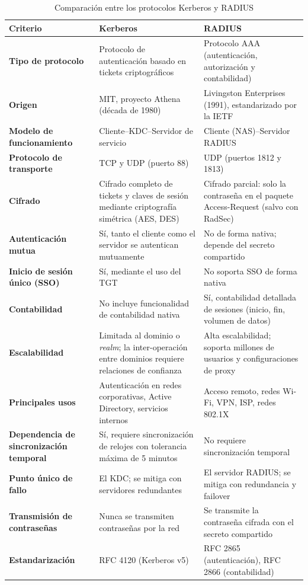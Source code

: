 \documentclass[letterpaper,12pt]{article}
\begin{document}
\begin{table}[h!]
\centering
\caption{Comparaci\'on entre los protocolos Kerberos y RADIUS}
\label{tab:comparacion}
\renewcommand{\arraystretch}{1.4}
\begin{tabularx}{\textwidth}{|>{\bfseries}p{3.8cm}|X|X|}
\hline
\textbf{Criterio} & \textbf{Kerberos} & \textbf{RADIUS} \\
\hline
Tipo de protocolo & Protocolo de autenticaci\'on basado en tickets criptogr\'aficos & Protocolo AAA (autenticaci\'on, autorizaci\'on y contabilidad) \\
\hline
Origen & MIT, proyecto Athena (d\'ecada de 1980) & Livingston Enterprises (1991), estandarizado por la IETF \\
\hline
Modelo de funcionamiento & Cliente--KDC--Servidor de servicio & Cliente (NAS)--Servidor RADIUS \\
\hline
Protocolo de transporte & TCP y UDP (puerto 88) & UDP (puertos 1812 y 1813) \\
\hline
Cifrado & Cifrado completo de tickets y claves de sesi\'on mediante criptograf\'ia sim\'etrica (AES, DES) & Cifrado parcial: solo la contrase\~na en el paquete Access-Request (salvo con RadSec) \\
\hline
Autenticaci\'on mutua & S\'i, tanto el cliente como el servidor se autentican mutuamente & No de forma nativa; depende del secreto compartido \\
\hline
Inicio de sesi\'on \'unico (SSO) & S\'i, mediante el uso del TGT & No soporta SSO de forma nativa \\
\hline
Contabilidad & No incluye funcionalidad de contabilidad nativa & S\'i, contabilidad detallada de sesiones (inicio, fin, volumen de datos) \\
\hline
Escalabilidad & Limitada al dominio o \textit{realm}; la inter-operaci\'on entre dominios requiere relaciones de confianza & Alta escalabilidad; soporta millones de usuarios y configuraciones de proxy \\
\hline
Principales usos & Autenticaci\'on en redes corporativas, Active Directory, servicios internos & Acceso remoto, redes Wi-Fi, VPN, ISP, redes 802.1X \\
\hline
Dependencia de sincronizaci\'on temporal & S\'i, requiere sincronizaci\'on de relojes con tolerancia m\'axima de 5 minutos & No requiere sincronizaci\'on temporal \\
\hline
Punto \'unico de fallo & El KDC; se mitiga con servidores redundantes & El servidor RADIUS; se mitiga con redundancia y failover \\
\hline
Transmisi\'on de contrase\~nas & Nunca se transmiten contrase\~nas por la red & Se transmite la contrase\~na cifrada con el secreto compartido \\
\hline
Estandarizaci\'on & RFC 4120 (Kerberos v5) & RFC 2865 (autenticaci\'on), RFC 2866 (contabilidad) \\
\hline
\end{tabularx}
\end{table}
\end{document}
